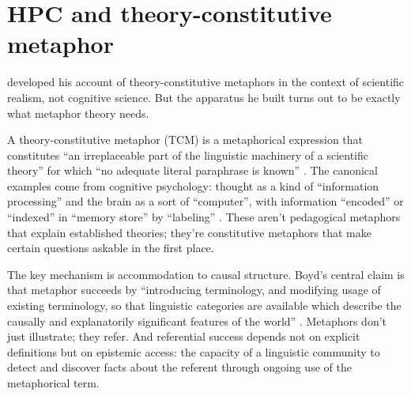 \documentclass[12pt]{article}
\begin{document}
\section{HPC and theory-constitutive metaphor}
\label{sec:hpc-tcm}

\textcite{boyd1979} developed his account of theory-constitutive metaphors in the context of scientific realism, not cognitive science. But the apparatus he built turns out to be exactly what metaphor theory needs.

A theory-constitutive metaphor (TCM) is a metaphorical expression that constitutes \enquote{an irreplaceable part of the linguistic machinery of a scientific theory} for which \enquote{no adequate literal paraphrase is known} \citep[360]{boyd1979}. The canonical examples come from cognitive psychology: thought as a kind of
\enquote{information processing} and the brain as a sort of \enquote{computer},
with information \enquote{encoded} or \enquote{indexed} in \enquote{memory
store} by \enquote{labeling} \citep[486]{boyd1993metaphor}. These aren't pedagogical metaphors that explain established theories; they're constitutive metaphors that make certain questions askable in the first place.

The key mechanism is accommodation to causal structure. Boyd's central claim is that metaphor succeeds by \enquote{introducing terminology, and modifying usage of existing terminology, so that linguistic categories are available which describe the causally and explanatorily significant features of the world} \citep[358]{boyd1979}. Metaphors don't just illustrate; they refer. And referential success depends not on explicit definitions but on epistemic access: the capacity of a linguistic community to detect and discover facts about the referent through ongoing use of the metaphorical term.
\end{document}
